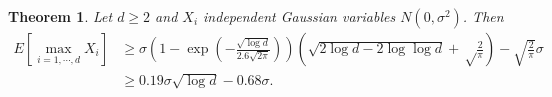 \documentclass{article}
\newtheorem{theorem}{Theorem}
\begin{document}

\begin{theorem}
Let $d\geq2$ and $X_i$ independent Gaussian variables $N(0,\sigma^2)$. Then
\begin{align*}
E\left[\max_{i=1,\cdots,d} X_i\right]
&\geq \sigma \left(1 - \exp\left(-\frac{\sqrt{\log d}}{2.6 \sqrt{2\pi}}\right)\right) \left(\sqrt{2 \log d-2\log \log d} +\sqrt\frac{2}{\pi}\right) -\sqrt{\frac{2}{\pi}} \sigma \\
&\geq 0.19 \sigma \sqrt{\log d} - 0.68 \sigma.
\end{align*}
\end{theorem}
\end{document}
